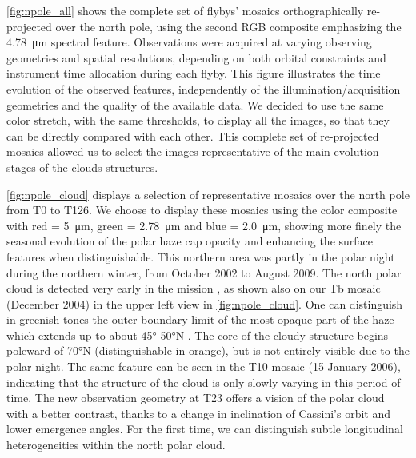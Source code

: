 \documentclass[preprint,twocolumn,5p,authoryear,compress,colorlinks=true]{elsarticle}
\newcommand{\figref}[1]{\autoref{fig:#1}}
\begin{document}
\figref{npole_all} shows the complete set of flybys' mosaics orthographically re-projected over the north pole, using the second RGB composite emphasizing the \SI{4.78}{\um} spectral feature. Observations were acquired at varying observing geometries and spatial resolutions, depending on both orbital constraints and instrument time allocation during each flyby. This figure illustrates the time evolution of the observed features, independently of the illumination/acquisition geometries and the quality of the available data. We decided to use the same color stretch, with the same thresholds, to display all the images, so that they can be directly compared with each other. This complete set of re-projected mosaics allowed us to select the images representative of the main evolution stages of the clouds structures.

\figref{npole_cloud} displays a selection of representative mosaics over the north pole from T0 to T126. We choose to display these mosaics using the color composite with red = \SI{5}{\um}, green = \SI{2.78}{\um} and blue = \SI{2.0}{\um}, showing more finely the seasonal evolution of the polar haze cap opacity and enhancing the surface features when distinguishable. This northern area was partly in the polar night during the northern winter, from October 2002 to August 2009.
The north polar cloud is detected very early in the mission \citep{Griffith2006}, as shown also on our Tb mosaic (December 2004) in the upper left view in \figref{npole_cloud}. One can distinguish in greenish tones the outer boundary limit of the most opaque part of the haze which extends up to about \ang{45}-\ang{50}N \citep{Rannou2012}. 
The core of the cloudy structure begins poleward of \ang{70}N (distinguishable in orange), but is not entirely visible due to the polar night. The same feature can be seen in the T10 mosaic (15 January 2006), indicating that the structure of the cloud is only slowly varying in this period of time. 
The new observation geometry at T23 offers a vision of the polar cloud with a better contrast, thanks to a change in inclination of Cassini's orbit and lower emergence angles. 
For the first time, we can distinguish subtle longitudinal heterogeneities within the north polar cloud.

\end{document}
